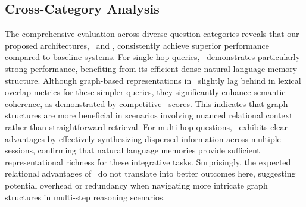 \subsection{Cross-Category Analysis}
The comprehensive evaluation across diverse question categories reveals that our proposed architectures, \mem~and \memp, consistently achieve superior performance compared to baseline systems. For single-hop queries, \mem~demonstrates particularly strong performance, benefiting from its efficient dense natural language memory structure. Although graph-based representations in \memp~slightly lag behind in lexical overlap metrics for these simpler queries, they significantly enhance semantic coherence, as demonstrated by competitive \Judge~scores. This indicates that graph structures are more beneficial in scenarios involving nuanced relational context rather than straightforward retrieval. For multi-hop questions, \mem~exhibits clear advantages by effectively synthesizing dispersed information across multiple sessions, confirming that natural language memories provide sufficient representational richness for these integrative tasks. Surprisingly, the expected relational advantages of \memp~do not translate into better outcomes here, suggesting potential overhead or redundancy when navigating more intricate graph structures in multi-step reasoning scenarios.

